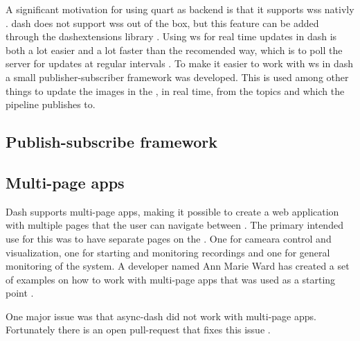 A significant motivation for using \gls{quart} as backend is that it supports \glspl{ws} nativly \cite{quartUsingWebsocketsQuart}.
\gls{dash} does not support \glspl{ws} out of the box, but this feature can be added through the \gls{dashextensions} library \cite{eriksenDashExtensionsWebSocket}.
Using \gls{ws} for real time updates in \gls{dash} is both a lot easier and a lot faster than the recomended way, which is to poll the server for updates at regular intervals \cite{plotlyLiveUpdatesDash}.
To make it easier to work with \gls{ws} in \gls{dash} a small publisher-subscriber framework was developed.
This is used among other things to update the images in the \srgui, in real time, from the topics  and  which the \gls{pipeline} publishes to.

\subsection{Publish-subscribe framework}

\subsection{Multi-page apps}
Dash supports multi-page apps, making it possible to create a web application with multiple pages that the user can navigate between \cite{plotlyMultiPageAppsURL}.
The primary intended use for this was to have separate pages on the \srgui.
One for cameara control and visualization, one for starting and monitoring recordings and one for general monitoring of the system.
A developer named Ann Marie Ward has created a set of examples on how to work with multi-page apps that was used as a starting point \cite{wardExamplesMultipageApps03Jul22}.

One major issue was that \gls{async-dash} did not work with multi-page apps.
Fortunately there is an open pull-request that fixes this issue \cite{lekAddFlaskRequest2022}.